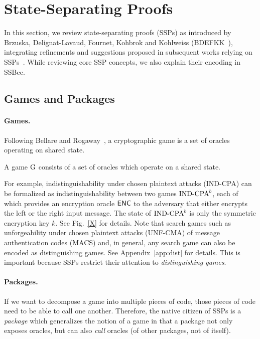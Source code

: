 \section{State-Separating Proofs}\label{sec:ssp}
In this section, we review state-separating proofs (SSPs)
as introduced by Brzuska, Delignat-Lavaud, Fournet, Kohbrok and
Kohlweiss (BDEFKK~\cite{X}), integrating refinements and
suggestions proposed in subsequent works relying on SSPs~\cite{blanket-cite,konrads-thesis,sabinesworks}. While reviewing core SSP concepts,
we also explain their encoding in SSBee.

\subsection{Games and Packages}
\paragraph{Games.}
Following Bellare and Rogaway~\cite{Bellare-Rogaway}, a cryptographic game is a set
of oracles operating on shared state.
\begin{definition}
A game $\text{\textrm{\upshape G}}$ consists of a set of oracles
which operate on a shared state.
\end{definition}
For example, indistinguishability under chosen plaintext attacks (IND-CPA)
can be formalized as indistinguishability between two games $\text{\textrm{\upshape IND-CPA}}^b$, 
each of which provides an encryption oracle $\mathsf{ENC}$ to the adversary that
either encrypts the left or the right input message. The state of 
$\text{\textrm{\upshape IND-CPA}}^b$ is only the symmetric encryption key $k$. See Fig.~\ref{X}
for details. Note that search games such as unforgeability under chosen
plaintext attacks (UNF-CMA) of message authentication codes (MACS) and, in general,
any search game can also be encoded as distinguishing games. See Appendix~\ref{app:dist} for details. This is important because SSPs restrict their attention to \emph{distinguishing games}.

\paragraph{Packages.}
If we want to decompose a game into multiple pieces of code, those pieces
of code need to be able to call one another. Therefore, the native citizen
of SSPs is a \emph{package} which generalizes the notion of a game in that
a package not only exposes oracles, but can also \emph{call} oracles (of
other packages, not of itself).

